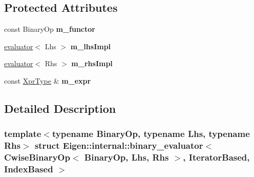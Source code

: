 \subsection*{Protected Attributes}
\begin{DoxyCompactItemize}
\item 
\mbox{\label{struct_eigen_1_1internal_1_1binary__evaluator_3_01_cwise_binary_op_3_01_binary_op_00_01_lhs_00_0cb5b32f8780f5e04222972f8f6ae2d90_abecc44c75458c4ffbf3f819f0b05a0b5}} 
const Binary\+Op {\bfseries m\+\_\+functor}
\item 
\mbox{\label{struct_eigen_1_1internal_1_1binary__evaluator_3_01_cwise_binary_op_3_01_binary_op_00_01_lhs_00_0cb5b32f8780f5e04222972f8f6ae2d90_af31789d7b31d1562321b653f62d56db1}} 
\hyperlink{struct_eigen_1_1internal_1_1evaluator}{evaluator}$<$ Lhs $>$ {\bfseries m\+\_\+lhs\+Impl}
\item 
\mbox{\label{struct_eigen_1_1internal_1_1binary__evaluator_3_01_cwise_binary_op_3_01_binary_op_00_01_lhs_00_0cb5b32f8780f5e04222972f8f6ae2d90_a806694f22e145df2f23429c7d4c0644b}} 
\hyperlink{struct_eigen_1_1internal_1_1evaluator}{evaluator}$<$ Rhs $>$ {\bfseries m\+\_\+rhs\+Impl}
\item 
\mbox{\label{struct_eigen_1_1internal_1_1binary__evaluator_3_01_cwise_binary_op_3_01_binary_op_00_01_lhs_00_0cb5b32f8780f5e04222972f8f6ae2d90_a3e656b656666f092f58801c60dc2825e}} 
const \hyperlink{group___core___module_class_eigen_1_1_cwise_binary_op}{Xpr\+Type} \& {\bfseries m\+\_\+expr}
\end{DoxyCompactItemize}


\subsection{Detailed Description}
\subsubsection*{template$<$typename Binary\+Op, typename Lhs, typename Rhs$>$\newline
struct Eigen\+::internal\+::binary\+\_\+evaluator$<$ Cwise\+Binary\+Op$<$ Binary\+Op, Lhs, Rhs $>$, Iterator\+Based, Index\+Based $>$}




